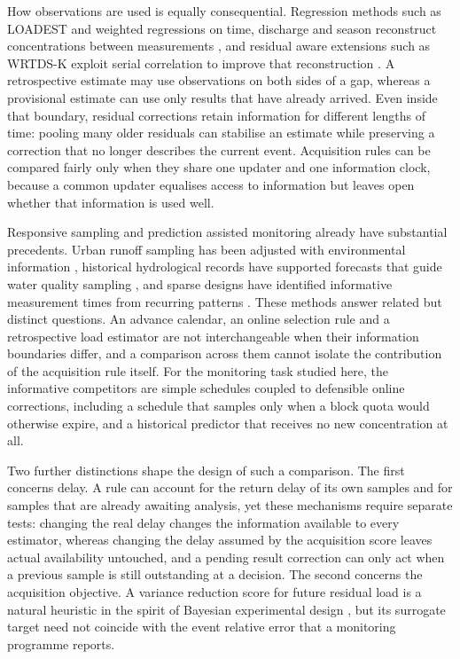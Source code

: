 \documentclass[pdflatex,sn-mathphys-num]{sn-jnl}%
\theoremstyle{thmstyleone}%
\theoremstyle{thmstyletwo}%
\theoremstyle{thmstylethree}%
\begin{document}
How observations are used is equally consequential. Regression methods such as LOADEST and weighted regressions on time, discharge and season reconstruct concentrations between measurements \citep{runkel2004,hirsch2010}, and residual aware extensions such as WRTDS-K exploit serial correlation to improve that reconstruction \citep{zhang2019}. A retrospective estimate may use observations on both sides of a gap, whereas a provisional estimate can use only results that have already arrived. Even inside that boundary, residual corrections retain information for different lengths of time: pooling many older residuals can stabilise an estimate while preserving a correction that no longer describes the current event. Acquisition rules can be compared fairly only when they share one updater and one information clock, because a common updater equalises access to information but leaves open whether that information is used well.

Responsive sampling and prediction assisted monitoring already have substantial precedents. Urban runoff sampling has been adjusted with environmental information \citep{wong2016}, historical hydrological records have supported forecasts that guide water quality sampling \citep{wilson2026}, and sparse designs have identified informative measurement times from recurring patterns \citep{manohar2018,binmamoon2025}. These methods answer related but distinct questions. An advance calendar, an online selection rule and a retrospective load estimator are not interchangeable when their information boundaries differ, and a comparison across them cannot isolate the contribution of the acquisition rule itself. For the monitoring task studied here, the informative competitors are simple schedules coupled to defensible online corrections, including a schedule that samples only when a block quota would otherwise expire, and a historical predictor that receives no new concentration at all.

Two further distinctions shape the design of such a comparison. The first concerns delay. A rule can account for the return delay of its own samples and for samples that are already awaiting analysis, yet these mechanisms require separate tests: changing the real delay changes the information available to every estimator, whereas changing the delay assumed by the acquisition score leaves actual availability untouched, and a pending result correction can only act when a previous sample is still outstanding at a decision. The second concerns the acquisition objective. A variance reduction score for future residual load is a natural heuristic in the spirit of Bayesian experimental design \citep{chaloner1995}, but its surrogate target need not coincide with the event relative error that a monitoring programme reports.
\end{document}

